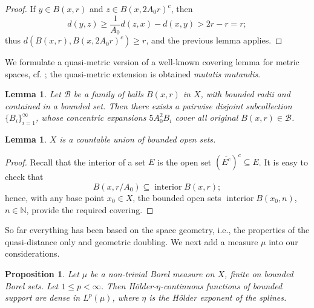 \documentclass{amsart}
\numberwithin{equation}{section}
\theoremstyle{plain}
\newtheorem{proposition}[equation]{Proposition}
\newtheorem{lemma}[equation]{Lemma}
\theoremstyle{definition}
\theoremstyle{remark}
\begin{document}
{{\begin{proof}
If $y\in B(x,r)$ and $z\in B(x,2A_0 r)^c$, then
\begin{equation*}
  d(y,z)\geq\frac{1}{A_0}d(z,x)-d(x,y)>2r-r=r;
\end{equation*}
thus $d(B(x,r),B(x,2A_0r)^c)\geq r$, and the previous lemma applies.
\end{proof}

We formulate a quasi-metric version of a well-known covering lemma for metric spaces, cf. \cite[Theorem 1.2]{Heinonen}; the quasi-metric extension is obtained \emph{mutatis mutandis}.

\begin{lemma}
Let $\mathscr{B}$ be a family of balls $B(x,r)$ in $X$, with bounded radii and contained in a bounded set. Then there exists a pairwise disjoint subcollection $\{B_i\}_{i=1}^{\infty}$, whose concentric expansions $5A_0^2 B_i$ cover all original $B(x,r)\in\mathscr{B}$.
\end{lemma}

\begin{lemma}\label{lemma:union}
$X$ is a countable union of bounded open sets.
\end{lemma}

\begin{proof}
Recall that the interior of a set $E$ is the open set $(\overline{E^c})^c\subseteq E$. It is easy to check that
\begin{equation*}
  B(x,r/A_0)\subseteq\operatorname{interior}B(x,r);
\end{equation*}
hence, with any base point $x_0\in X$, the bounded open sets $\operatorname{interior}B(x_0,n)$, $n\in{\mathbb{N}}$, provide the required covering.
\end{proof}

So far everything has been based on the space geometry, i.e., the properties of the quasi-distance only and geometric doubling. We next add a {measure $\mu$} into our considerations.  

\begin{proposition}\label{prop:density} Let $\mu$ be a non-trivial Borel measure on $X$, finite on bounded Borel sets.
Let $1\leq p<\infty$. Then H\"older-$\eta$-continuous functions of bounded support are dense in $L^p(\mu)$, where $\eta$ is the H\"older exponent of the splines.
\end{proposition}

}}
\end{document}
